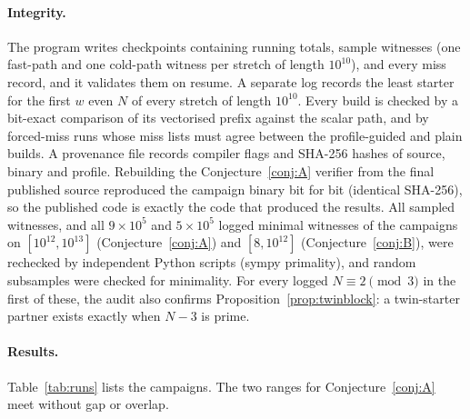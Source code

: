 \documentclass[11pt]{article}
\theoremstyle{definition}
\theoremstyle{remark}
\begin{document}
\paragraph{Integrity.}
The program writes checkpoints containing running totals, sample witnesses
(one fast-path and one cold-path witness per stretch of length $10^{10}$), and
every miss record, and it validates them on resume. A separate
log records the least starter for the first $w$ even $N$ of every stretch of
length $10^{10}$. Every build is checked by a bit-exact comparison of its
vectorised prefix against the scalar path, and by forced-miss runs whose miss
lists must agree between the profile-guided and plain builds. A provenance file
records compiler flags and SHA-256 hashes of source, binary and profile. Rebuilding
the Conjecture~\ref{conj:A} verifier from the final published source reproduced the
campaign binary bit for bit (identical SHA-256), so the published code is exactly the
code that produced the results. All
sampled witnesses, and all $9\times10^5$ and $5\times10^5$ logged minimal witnesses of
the campaigns on $[10^{12},10^{13}]$ (Conjecture~\ref{conj:A}) and $[8,10^{12}]$
(Conjecture~\ref{conj:B}), were rechecked by independent Python scripts (sympy
primality), and random subsamples were checked for minimality. For every logged
$N\equiv 2\pmod 3$ in the first of these, the audit also confirms
Proposition~\ref{prop:twinblock}: a twin-starter partner exists exactly when $N-3$
is prime.

\paragraph{Results.} Table~\ref{tab:runs} lists the campaigns. The two
ranges for Conjecture~\ref{conj:A} meet without gap or overlap.
\end{document}
